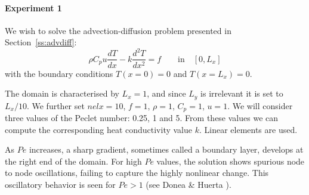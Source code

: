 
\paragraph{Experiment 1}
We wish to solve the advection-diffusion problem presented in 
Section~\ref{ss:advdiff}:
\begin{equation}
\rho C_p u \frac{dT}{dx} - k \frac{d^2T}{dx^2} = f \qquad \text{in} \quad [0,L_x]
\end{equation}
with the boundary conditions $T(x=0)=0$ and $T(x=L_x)=0$.

The domain is characterised by $L_x=1$, and since $L_y$ is irrelevant it is set to $L_x/10$.
We further set $nelx=10$, $f=1$, $\rho=1$, $C_p=1$, $u=1$.
We will consider three values of the Peclet number: 0.25, 1 and 5.
From these values we can compute the corresponding heat conductivity value $k$.
Linear elements are used.

As $Pe$ increases, a sharp gradient, sometimes called a boundary layer,
develops at the right end of the domain. For high $Pe$ values, the solution shows 
spurious node to node oscillations, failing to capture the highly nonlinear change. This oscillatory
behavior is seen for $Pe>1$ (see Donea \& Huerta \cite{dohu03}).

